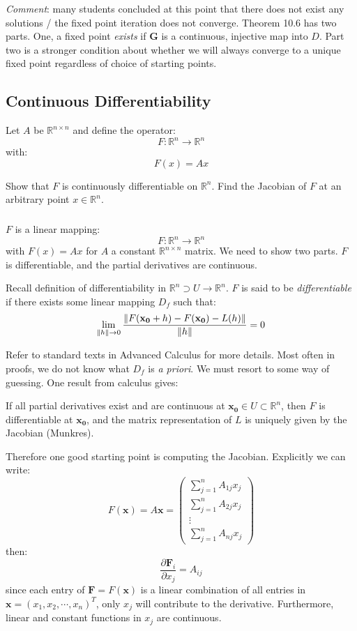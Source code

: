 \documentclass[12pt]{article} %
\newcommand{\rr}{\mathbb{R}}
\newcommand{\1}[1]{\mathds{1}\left[#1\right]}
\begin{document}
\emph{Comment}: many students concluded at this point that there does not exist any solutions / the fixed point iteration does not converge. Theorem 10.6 has two parts. One, a fixed point \emph{exists} if $\mathbf{G}$ is a continuous, injective map into $D$. Part two is a stronger condition about whether we will always converge to a unique fixed point regardless of choice of starting points.





\newpage
\subsection{Continuous Differentiability}
Let $A$ be $\rr^{n\times n}$ and define the operator:
$$
	F: \rr^{n}\rightarrow \rr^n
$$ with:
$$
	F(x) = Ax
$$ 

Show that $F$ is continuously differentiable on $\rr^n$. Find the Jacobian of $F$ at an arbitrary point $x\in \rr^n$.
\subsubsection{}
$F$ is a linear mapping:
$$
	F: \rr^n\rightarrow \rr^n
$$ with $F(x) = Ax$ for $A$ a constant $\rr^{n\times n}$ matrix. We need to show two parts. $F$ is differentiable, and the partial derivatives are continuous.

Recall definition of differentiability in $\rr^n\supset U\rightarrow \rr^n$. $F$ is said to be \emph{differentiable} if there exists some linear mapping $D_f$ such that:
$$
	\lim_{\norm{h}\rightarrow 0}\frac{\norm{F(\mathbf{x_0}+h) - F(\mathbf{x_0})-L(h)}}{\norm{h}}=0
$$

Refer to standard texts in Advanced Calculus for more details. Most often in proofs, we do not know what $D_f$ is \emph{a priori}. We must resort to some way of guessing. One result from calculus gives:

If all partial derivatives exist and are continuous at $\mathbf{x_0}\in U\subset \rr^n$, then $F$ is differentiable at $\mathbf{x_0}$, and the matrix representation of $L$ is uniquely given by the Jacobian (Munkres).

Therefore one good starting point is computing the Jacobian. Explicitly we can write:
$$
	F(\mathbf{x}) = A\mathbf{x} = 
	\begin{pmatrix}
		\sum_{j=1}^nA_{1j}x_j\\
		\sum_{j=1}^nA_{2j}x_j\\
		\vdots\\
		\sum_{j=1}^nA_{nj}x_j
	\end{pmatrix}
$$ then:
$$
	\frac{\partial \mathbf{F}_i}{\partial x_j} = A_{ij}
$$ since each entry of $\mathbf{F} = F(\mathbf{x})$ is a linear combination of all entries in $\mathbf{x} = (x_1,x_2,\cdots,x_n)^T$, only $x_j$ will contribute to the derivative. Furthermore, linear and constant functions in $x_j$ are continuous.
\end{document}

